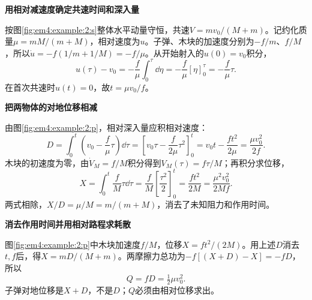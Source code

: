 \begin{solution}\textbf{用相对减速度确定共速时间和深入量}\par\nobreak
按图\ref{fig:em4:example:2:s}整体水平动量守恒，共速$V=mv_0/(M+m)$。记约化质量$\mu=mM/(m+M)$，相对速度为$u$。子弹、木块的加速度分别为$-f/m$、$f/M$，所以$\dot u=-f(1/m+1/M)=-f/\mu$。从开始射入的$u(0)=v_0$积分，
\[
u(\tau)-v_0=-\frac f\mu\int_0^\tau\dd\eta
=-\frac f\mu[\eta]_0^\tau=-\frac f\mu\tau.
\]
在首次共速时$u(t)=0$，故$t=\mu v_0/f$。



\par\medskip{}\noindent\textbf{把两物体的对地位移相减}\par\nobreak
由图\ref{fig:em4:example:2:p}，相对深入量应积相对速度：
\[
D=\int_0^t\left(v_0-\frac f\mu\tau\right)\dd\tau
=\left[v_0\tau-\frac f{2\mu}\tau^2\right]_0^t
=v_0t-\frac{ft^2}{2\mu}=\frac{\mu v_0^2}{2f}.
\]
木块的初速度为零，由$\dot V_M=f/M$积分得到$V_M(\tau)=f\tau/M$；再积分求位移，
\[
X=\int_0^t\frac fM\tau\dd\tau
=\frac fM\left[\frac{\tau^2}{2}\right]_0^t
=\frac{ft^2}{2M}=\frac{\mu^2v_0^2}{2Mf}.
\]
两式相除，$X/D=\mu/M=m/(m+M)$，消去了未知阻力和作用时间。



\par\medskip{}\noindent\textbf{消去作用时间并用相对路程求耗散}\par\nobreak
图\ref{fig:em4:example:2:p}中木块加速度$f/M$，位移$X=ft^2/(2M)$。用上述$D$消去$t,f$后，得$\boxed{X=mD/(M+m)}$。两摩擦力总功为$-f[(X+D)-X]=-fD$，所以
\[\boxed{Q=fD=\tfrac12\mu v_0^2}.\]
子弹对地位移是$X+D$，不是$D$；$Q$必须由相对位移求出。\end{solution}
